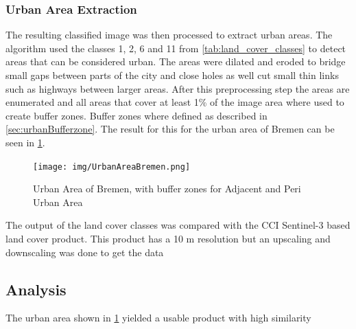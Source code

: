 \documentclass[12pt,a4paper, english,twoside]{article}
\begin{document}
    \subsubsection{Urban Area Extraction}\label{sec:urbanAreaExtraction}
      The resulting classified image was then processed to extract urban areas.
      The algorithm used the classes 1, 2, 6 and 11 from \cref{tab:land_cover_classes} to detect areas that can be considered urban.
      The areas were \gls{dilated} and \gls{eroded} to bridge small gaps between parts of the city and close holes as well cut small thin links such as highways between larger areas.
      After this preprocessing step the areas are enumerated and all areas that cover at least 1\% of the image area where used to create buffer zones. 
      Buffer zones where defined as described in \cref{sec:urbanBufferzone}. 
      The result for this for the urban area of Bremen can be seen in \cref{fig:bufferedBremen}.\\
      \begin{figure}
        \texttt{[image: img/UrbanAreaBremen.png]}
        \caption{Urban Area of Bremen, with buffer zones for Adjacent and Peri Urban Area\label{fig:bufferedBremen}}
      \end{figure}
  The output of the land cover classes was compared with the CCI Sentinel-3 based land cover product. 
  This product has a 10 m resolution but an upscaling and downscaling was done to get the data 
 \subsection{Analysis}\label{sec:landcoverAnalysis} 
The urban area shown in \cref{fig:bufferedBremen} yielded a usable product with high similarity 
   
\end{document}
